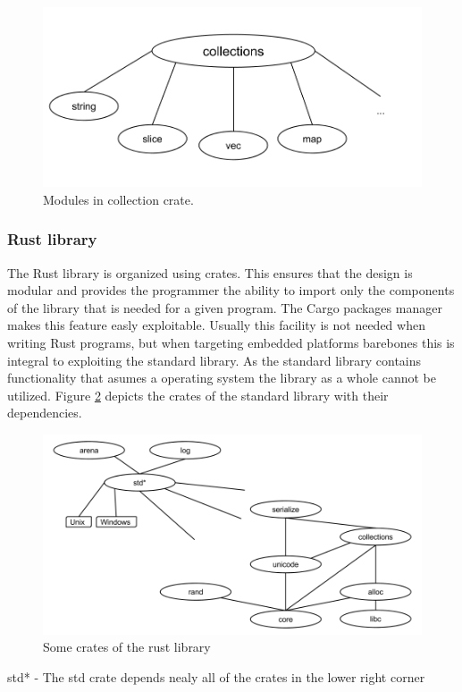 \begin{figure}[H]
  \begin{center}
    \includegraphics[scale=0.3]{figures/background/rust/libcollections.png}
  \end{center}
  \caption{Modules in collection crate.}
  \label{fig:rust:collections}
\end{figure}

\subsubsection{Rust library}

The Rust library is organized using crates.
This ensures that the design is modular and provides the programmer the ability to import only the components of the library that is needed for a given program.
The Cargo packages manager makes this feature easly exploitable.
Usually this facility is not needed when writing Rust programs, but when targeting embedded platforms barebones this is integral to exploiting the standard library.
As the standard library contains functionality that asumes a operating system the library as a whole cannot be utilized.
Figure \ref{fig:rust:librust} depicts the crates of the standard library with their dependencies.

\begin{figure}[H]
  \begin{center}
    \includegraphics[scale=0.3]{figures/background/rust/rust-lib.png}
  \end{center}
  \caption{Some crates of the rust library}
  \label{fig:rust:librust}
\end{figure}
std* - The std crate depends nealy all of the crates in the lower right corner

